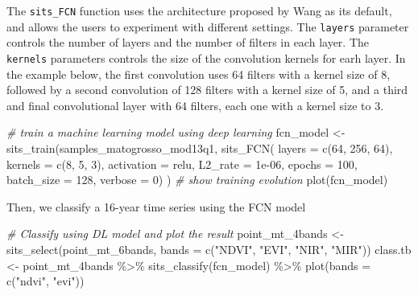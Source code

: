 \documentclass[a4paper,]{tufte-book}
\newenvironment{Shaded}{}{}
\newcommand{\AttributeTok}[1]{\textcolor[rgb]{0.49,0.56,0.16}{#1}}
\newcommand{\CommentTok}[1]{\textcolor[rgb]{0.38,0.63,0.69}{\textit{#1}}}
\newcommand{\DecValTok}[1]{\textcolor[rgb]{0.25,0.63,0.44}{#1}}
\newcommand{\FloatTok}[1]{\textcolor[rgb]{0.25,0.63,0.44}{#1}}
\newcommand{\FunctionTok}[1]{\textcolor[rgb]{0.02,0.16,0.49}{#1}}
\newcommand{\NormalTok}[1]{#1}
\newcommand{\OtherTok}[1]{\textcolor[rgb]{0.00,0.44,0.13}{#1}}
\newcommand{\SpecialCharTok}[1]{\textcolor[rgb]{0.25,0.44,0.63}{#1}}
\newcommand{\StringTok}[1]{\textcolor[rgb]{0.25,0.44,0.63}{#1}}
\begin{document}
The \texttt{sits\_FCN} function uses the architecture proposed by Wang as its default, and allows the users to experiment with different settings. The \texttt{layers} parameter controls the number of layers and the number of filters in each layer. The \texttt{kernels} parameters controls the size of the convolution kernels for earh layer. In the example below, the first convolution uses 64 filters with a kernel size of 8, followed by a second convolution of 128 filters with a kernel size of 5, and a third and final convolutional layer with 64 filters, each one with a kernel size to 3.

\begin{Shaded}
\begin{Highlighting}[]
\CommentTok{\# train a machine learning model using deep learning}
\NormalTok{fcn\_model }\OtherTok{\textless{}{-}} \FunctionTok{sits\_train}\NormalTok{(samples\_matogrosso\_mod13q1, }
                        \FunctionTok{sits\_FCN}\NormalTok{(}
                            \AttributeTok{layers           =} \FunctionTok{c}\NormalTok{(}\DecValTok{64}\NormalTok{, }\DecValTok{256}\NormalTok{, }\DecValTok{64}\NormalTok{),}
                            \AttributeTok{kernels          =} \FunctionTok{c}\NormalTok{(}\DecValTok{8}\NormalTok{, }\DecValTok{5}\NormalTok{, }\DecValTok{3}\NormalTok{),}
                            \AttributeTok{activation       =} \StringTok{\textquotesingle{}relu\textquotesingle{}}\NormalTok{,}
                            \AttributeTok{L2\_rate          =} \FloatTok{1e{-}06}\NormalTok{,}
                            \AttributeTok{epochs           =} \DecValTok{100}\NormalTok{,}
                            \AttributeTok{batch\_size       =} \DecValTok{128}\NormalTok{,}
                            \AttributeTok{verbose          =} \DecValTok{0}\NormalTok{) )}
\CommentTok{\# show training evolution}
\FunctionTok{plot}\NormalTok{(fcn\_model)}
\end{Highlighting}
\end{Shaded}

Then, we classify a 16-year time series using the FCN model

\begin{Shaded}
\begin{Highlighting}[]
\CommentTok{\# Classify using DL model and plot the result}
\NormalTok{point\_mt\_4bands }\OtherTok{\textless{}{-}} \FunctionTok{sits\_select}\NormalTok{(point\_mt\_6bands, }
                               \AttributeTok{bands =} \FunctionTok{c}\NormalTok{(}\StringTok{"NDVI"}\NormalTok{, }\StringTok{"EVI"}\NormalTok{, }\StringTok{"NIR"}\NormalTok{, }\StringTok{"MIR"}\NormalTok{))}
\NormalTok{class.tb }\OtherTok{\textless{}{-}}\NormalTok{ point\_mt\_4bands }\SpecialCharTok{\%\textgreater{}\%} 
    \FunctionTok{sits\_classify}\NormalTok{(fcn\_model) }\SpecialCharTok{\%\textgreater{}\%} 
    \FunctionTok{plot}\NormalTok{(}\AttributeTok{bands =} \FunctionTok{c}\NormalTok{(}\StringTok{"ndvi"}\NormalTok{, }\StringTok{"evi"}\NormalTok{))}
\end{Highlighting}
\end{Shaded}
\end{document}
